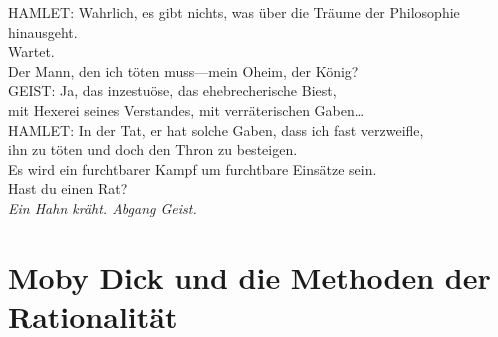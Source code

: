 \begin{playdialog}
HAMLET: Wahrlich, es gibt nichts, was über die Träume der Philosophie hinausgeht.\\
Wartet.\\
Der Mann, den ich töten muss—mein Oheim, der König?\\

%
GEIST: Ja, das inzestuöse, das ehebrecherische Biest,\\
mit Hexerei seines Verstandes, mit verräterischen Gaben…\\

HAMLET: In der Tat, er hat solche Gaben, dass ich fast verzweifle,\\
ihn zu töten und doch den Thron zu besteigen.\\
Es wird ein furchtbarer Kampf um furchtbare Einsätze sein.\\
Hast du einen Rat?\\

\emph{Ein Hahn kräht. Abgang Geist.}\\

\end{playdialog}

\section{Moby Dick und die Methoden der Rationalität}

